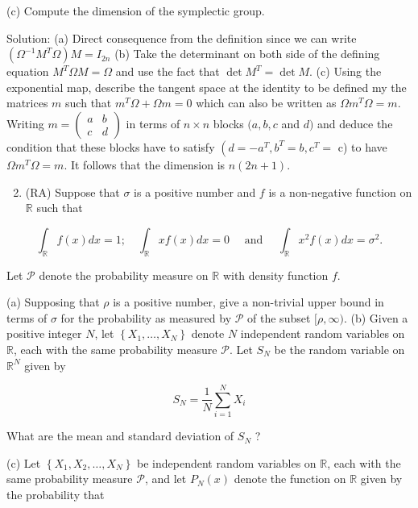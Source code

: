 \documentclass[10pt]{article}
\begin{document}
(c) Compute the dimension of the symplectic group.

Solution: (a) Direct consequence from the definition since we can write $\left(\Omega^{-1} M^{T} \Omega\right) M=I_{2 n}$ (b) Take the determinant on both side of the defining equation $M^{T} \Omega M=\Omega$ and use the fact that $\operatorname{det} M^{T}=\operatorname{det} M$. (c) Using the exponential map, describe the tangent space at the identity to be defined my the matrices $m$ such that $m^{T} \Omega+\Omega m=0$ which can also be written as $\Omega m^{T} \Omega=m$. Writing $m=\left(\begin{array}{ll}a & b \\ c & d\end{array}\right)$ in terms of $n \times n$ blocks $(a, b, c$ and $d)$ and deduce the condition that these blocks have to satisfy $\left(d=-a^{T}, b^{T}=b, c^{T}=\right.$ c) to have $\Omega m^{T} \Omega=m$. It follows that the dimension is $n(2 n+1)$.

\begin{enumerate}
  \setcounter{enumi}{1}
  \item (RA) Suppose that $\sigma$ is a positive number and $f$ is a non-negative function on $\mathbb{R}$ such that
\end{enumerate}

$$
\int_{\mathbb{R}} f(x) d x=1 ; \quad \int_{\mathbb{R}} x f(x) d x=0 \quad \text { and } \quad \int_{\mathbb{R}} x^{2} f(x) d x=\sigma^{2} .
$$

Let $\mathcal{P}$ denote the probability measure on $\mathbb{R}$ with density function $f$.

(a) Supposing that $\rho$ is a positive number, give a non-trivial upper bound in terms of $\sigma$ for the probability as measured by $\mathcal{P}$ of the subset $[\rho, \infty)$.
(b) Given a positive integer $N$, let $\left\{X_{1}, \ldots, X_{N}\right\}$ denote $N$ independent random variables on $\mathbb{R}$, each with the same probability measure $\mathcal{P}$. Let $S_{N}$ be the random variable on $\mathbb{R}^{N}$ given by

$$
S_{N}=\frac{1}{N} \sum_{i=1}^{N} X_{i}
$$

What are the mean and standard deviation of $S_{N}$ ?

(c) Let $\left\{X_{1}, X_{2}, \ldots, X_{N}\right\}$ be independent random variables on $\mathbb{R}$, each with the same probability measure $\mathcal{P}$, and let $P_{N}(x)$ denote the function on $\mathbb{R}$ given by the probability that
\end{document}
